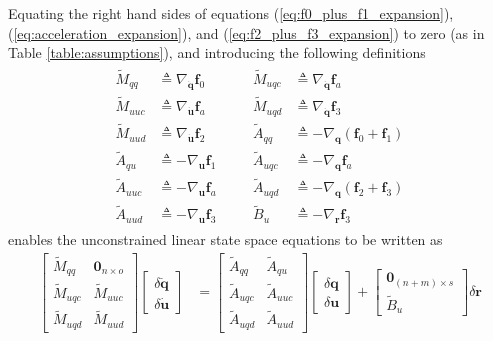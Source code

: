 \documentclass[smallcondensed,final]{svjour3}                     %
\begin{document}
Equating the right hand sides of equations (\ref{eq:f0_plus_f1_expansion}),
(\ref{eq:acceleration_expansion}),
and (\ref{eq:f2_plus_f3_expansion}) to zero (as in Table
\ref{table:assumptions}), and introducing the following definitions
\begin{align}
\label{eq:quant_to_compute}
  \begin{array}{llcll}
    \tilde{M}_{qq}  &\triangleq \nabla_{\bm{\dot{q}}}\bm{f}_0 & \quad &
    \tilde{M}_{uqc} &\triangleq \nabla_{\bm{\dot{q}}}\bm{f}_a \\
    \tilde{M}_{uuc} &\triangleq \nabla_{\bm{\dot{u}}}\bm{f}_a & \quad &
    \tilde{M}_{uqd} &\triangleq \nabla_{\bm{\dot{q}}}\bm{f}_3 \\
    \tilde{M}_{uud} &\triangleq \nabla_{\bm{\dot{u}}}\bm{f}_2 & \quad &
    \tilde{A}_{qq}  &\triangleq -\nabla_{\bm{q}}(\bm{f}_0 + \bm{f}_1) \\
    \tilde{A}_{qu}  &\triangleq -\nabla_{\bm{u}}\bm{f}_1 & \quad &
    \tilde{A}_{uqc} &\triangleq - \nabla_{\bm{q}} \bm{f}_a \\
    \tilde{A}_{uuc} &\triangleq - \nabla_{\bm{u}} \bm{f}_a & \quad &
    \tilde{A}_{uqd} &\triangleq - \nabla_{\bm{q}} (\bm{f}_2 + \bm{f}_3) \\
    \tilde{A}_{uud} &\triangleq - \nabla_{\bm{u}} \bm{f}_3 & \quad &
    \tilde{B}_{u}   &\triangleq -\nabla_{\bm{r}}\bm{f}_{3}
  \end{array}
\end{align}
enables the unconstrained linear state space equations to be written as
\begin{align}
  \label{eq:state_space_unconstrained}
  \left[
    \begin{array}{cc}
      \tilde{M}_{qq} & \bm{0}_{n \times o} \\
      \tilde{M}_{uqc} & \tilde{M}_{uuc} \\
      \tilde{M}_{uqd} & \tilde{M}_{uud}
    \end{array}
    \right]
    \left[
      \begin{array}{c}
        \delta \bm{\dot{q}} \\
        \delta \bm{\dot{u}}
      \end{array}
    \right]
   &=
   \left[
     \begin{array}{cc}
       \tilde{A}_{qq} & \tilde{A}_{qu} \\
       \tilde{A}_{uqc} & \tilde{A}_{uuc} \\
       \tilde{A}_{uqd} & \tilde{A}_{uud}
     \end{array}
   \right]
    \left[
      \begin{array}{c}
        \delta \bm{q} \\
        \delta \bm{u}
      \end{array}
    \right]
    +
    \left[
      \begin{array}{c}
        \bm{0}_{(n + m) \times s} \\
        \tilde{B}_{u}
      \end{array}
    \right]
    \delta \bm{r}
\end{align}
\end{document}
